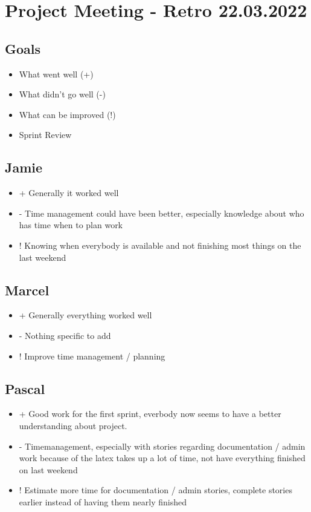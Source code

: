 \section{Project Meeting - Retro 22.03.2022}

\subsection{Goals}
\begin{itemize}
    \item What went well (+)
    \item What didn't go well (-)
    \item What can be improved (!)
    \item Sprint Review
\end{itemize}

\subsection{Jamie}
\begin{itemize}
    \item + Generally it worked well
    \item - Time management could have been better, especially knowledge about who has time when to plan work
    \item ! Knowing when everybody is available and not finishing most things on the last weekend
\end{itemize}

\subsection{Marcel}
\begin{itemize}
    \item + Generally everything worked well
    \item - Nothing specific to add
    \item ! Improve time management / planning
\end{itemize}

\subsection{Pascal}
\begin{itemize}
    \item + Good work for the first sprint, everbody now seems to have a better understanding about project.
    \item - Timemanagement, especially with stories regarding documentation / admin work because of the latex takes up a lot of time, not have everything finished on last weekend
    \item ! Estimate more time for documentation / admin stories, complete stories earlier instead of having them nearly finished
\end{itemize}

